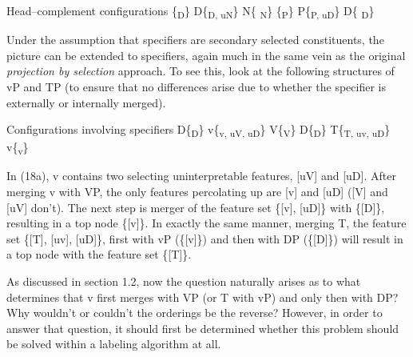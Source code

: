 \documentclass[output=paper
,modfonts
,nonflat]{langsci/langscibook}
\begin{document}
\begin{exe}
	\ex Head–complement configurations
	\xlist
	\ex {\lbrack}\{\textsubscript{{\lbrack}D{\rbrack}}\} {\lbrack}D\{\textsubscript{{\lbrack}D{\rbrack}, {\lbrack}uN{\rbrack}}\} N\{\textsubscript{{\lbrack} N{\rbrack}}\}{\rbrack}{\rbrack}
	\ex {\lbrack}\{\textsubscript{{\lbrack}P{\rbrack}}\} {\lbrack}P\{\textsubscript{{\lbrack}P{\rbrack}, {\lbrack}uD{\rbrack}}\} D\{\textsubscript{{\lbrack} D{\rbrack}}\}{\rbrack}{\rbrack}
	\endxlist
\end{exe}
Under the assumption that specifiers are secondary selected constituents, the picture can be extended to specifiers, again much in the same vein as the original \textit{projection by selection} approach. To see this, look at the following structures of vP and TP (to ensure that no differences arise due to whether the specifier is externally or internally merged).

\begin{exe}
	\ex Configurations involving specifiers
		\xlist
		\ex {\lbrack}D\{\textsubscript{{\lbrack}D{\rbrack}}\} {\lbrack}v\{\textsubscript{{\lbrack}v{\rbrack}, {\lbrack}uV{\rbrack}, {\lbrack}uD{\rbrack}}\} V\{\textsubscript{{\lbrack}V{\rbrack}}\}{\rbrack}{\rbrack}
		\ex {\lbrack}D\{\textsubscript{{\lbrack}D{\rbrack}}\} {\lbrack}T\{\textsubscript{{\lbrack}T{\rbrack}, {\lbrack}uv{\rbrack}, {\lbrack}uD{\rbrack}}\} v\{\textsubscript{{\lbrack}v{\rbrack}}\}{\rbrack}{\rbrack}
		\endxlist
	\end{exe}
In (18a), v contains two selecting uninterpretable features, [uV] and [uD]. After merging v with VP, the only features percolating up are [v] and [uD] ([V] and [uV] don’t). The next step is merger of the feature set \{[v], [uD]\} with \{[D]\}, resulting in a top node \{[v]\}. In exactly the same manner, merging T, the feature set \{[T], [uv], [uD]\}, first with vP (\{[v]\}) and then with DP (\{[D]\}) will result in a top node with the feature set \{[T]\}.

As discussed in section 1.2, now the question naturally arises as to what determines that v first merges with VP (or T with vP) and only then with DP? Why wouldn’t or couldn’t the orderings be the reverse? However, in order to answer that question, it should first be determined whether this problem should be solved within a labeling algorithm at all.
\end{document}
